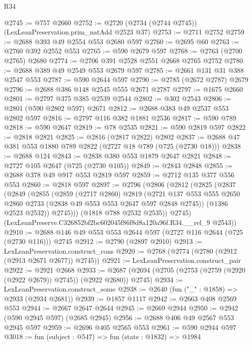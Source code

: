 \begin{lexlean}{R34}
\begin{coremodule}
@2745 := @757 @2660
@2752 := @2720 (@2734 (@2744 @2745)) (LexLeanPreservation.prim_natAdd @2523 @37)
@2753 := @2711 @2752
@2759 := @2688 @393 @49 @2554 @553 @2680 @597
@2760 := @2695 @60
@2763 := @2760 @392 @2552 @553
@2765 := @590 @2679 @597
@2768 := @2763 (@2700 @2765) @2680
@2774 := @2706 @391 @2528 @2551 @2668 @2765 @2752
@2780 := @2688 @389 @49 @2549 @553 @2679 @597
@2785 := @2661 @131 @31 @388 @2547 @553
@2787 := @590 @2644 @597
@2790 := @2785 (@2672 @2787) @2679
@2796 := @2688 @386 @148 @2545 @555 @2671 @2787
@2797 := @1675 @2660
@2801 := @2797 @375 @385 @2539 @2544
@2802 := @302 @2543
@2806 := @2801 (@590 @2802 @597) @2671
@2812 := @2688 @383 @49 @2537 @553 @2802 @597
@2816 := @2797 @116 @382 @1881 @2536
@2817 := @590 @789
@2818 := @590 @2647
@2819 := @78 @2535
@2821 := @590 @2819 @597
@2822 := @2818 @2821
@2825 := @2816 (@2817 @2822) @2802
@2837 := @2688 @47 @381 @553 @1880 @789 @2822 (@2727 @18 @789 (@725 (@2730 @18)))
@2838 := @2688 @124
@2843 := @2838 @380 @553 @1879 @2647 @2821
@2848 := @2727 @105 @2647 (@725 (@2730 @105))
@2849 := @2843 @2848
@2855 := @2688 @378 @49 @917 @553 @2819 @597
@2859 := @2712 @135 @377 @556 @553
@2860 := @2818 @597
@2897 := @2796
    (@2806
      (@2812
        (@2825
          (@2837
            (@2849
              (@2855
                (@2859
                  (@2717 @2860)
                  @2819
                  (@2721
                    @137
                    @553
                    @555
                    @2650
                    @2860
                    @2733
                    (@2838 @49 @553 @553 @2647 @597 @2848 @2745))
                  (@1386 @2523 @2532))
                @2745)))
          (@1818 @788 @2532 @2535))
        @2745)
      (LexLeanPreserve.C326852bf2bc602045f86f8d8a120a96f.R34.__rel_9 @2543))
@2910 := @2688 @146 @49 @553 @553 @2644 @597 (@2727 @116 @2644 (@725 (@2730 @116))) @2745
@2912 := @2790 (@2897 @2910)
@2913 := LexLeanPreservation.construct_cons
@2920 := @2768 (@2774 (@2780 (@2912 (@2913 @2671 @2677)) @2745))
@2921 := LexLeanPreservation.construct_pair
@2922 := @2921 @2668
@2933 := @2687 (@2694 (@2705 (@2753 (@2759 (@2920 (@2922 @2679)) @2745)) (@2922 @2680)) @2745)
@2934 := LexLeanPreservation.construct_some
@2938 := @2640 (fun ("_" : @1858) => @2933 (@2934 @2681))
@2939 := @1857 @1117
@2942 := @2663 @408 @2569 @553
@2944 := @2667 @2647 @2644
@2945 := @2669 @2944
@2950 := @2942 (@590 @2945 @597) (@2685 @2945)
@2956 := @2688 @406 @49 @2567 @553 @2945 @597
@2959 := @2696 @405 @2565 @553
@2961 := @590 @2944 @597
@3018 := fun (subject : @547) =>
  fun (state : @1832) =>
  @1984

\end{coremodule}
\end{lexlean}
